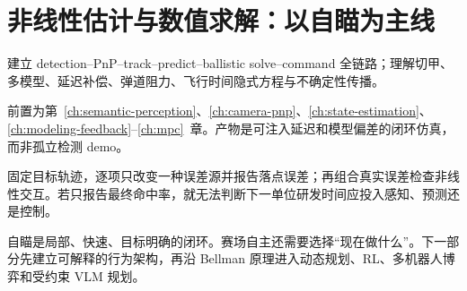 \chapter{非线性估计与数值求解：以自瞄为主线}
\label{ch:auto-aim-method}

\begin{learningobjectives}
建立 detection--PnP--track--predict--ballistic solve--command 全链路；理解切甲、多模型、延迟补偿、弹道阻力、飞行时间隐式方程与不确定性传播。
\end{learningobjectives}

\begin{prerequisites}
前置为第~\ref{ch:semantic-perception}、\ref{ch:camera-pnp}、\ref{ch:state-estimation}、\ref{ch:modeling-feedback}--\ref{ch:mpc}~章。产物是可注入延迟和模型偏差的闭环仿真，而非孤立检测 demo。
\end{prerequisites}


\begin{engineeringcheck}
固定目标轨迹，逐项只改变一种误差源并报告落点误差；再组合真实误差检查非线性交互。若只报告最终命中率，就无法判断下一单位研发时间应投入感知、预测还是控制。
\end{engineeringcheck}

\begin{chaptertransition}
自瞄是局部、快速、目标明确的闭环。赛场自主还需要选择“现在做什么”。下一部分先建立可解释的行为架构，再沿 Bellman 原理进入动态规划、RL、多机器人博弈和受约束 VLM 规划。
\end{chaptertransition}

